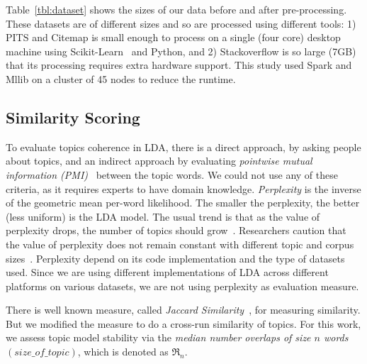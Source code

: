\documentclass[twocolumn,5p,sort&compress]{elsarticle}
\theoremstyle{break}
\begin{document}
  Table~\ref{tbl:dataset} shows the sizes of our data before and after pre-processing.
  These datasets are of different sizes and so are processed using different tools: 1) PITS and Citemap is small enough to process on a single (four core) desktop machine
  using Scikit-Learn~\cite{pedregosa2011scikit} and Python, and 2) Stackoverflow is so large (7GB) that its  processing requires extra hardware support.
 This study used Spark and Mllib on a cluster of 45 nodes to
 reduce the runtime.
  




\subsection{Similarity Scoring}
To evaluate topics coherence in LDA, there is a direct approach, by asking people about topics, and an indirect approach by evaluating \textit{pointwise mutual information (PMI)}~\cite{lau2014machine, o2015analysis} between the topic words. We could not use any of these criteria, as it requires experts to have domain knowledge. \textit{Perplexity} is  the inverse of the geometric mean per-word likelihood. The smaller the perplexity, the better (less uniform) is the LDA model. The usual trend is that as the value of perplexity drops, the number of topics should grow~\cite{koltcov2014latent}. Researchers caution that the value of perplexity does not remain constant with different topic and corpus sizes~\cite{ zhao2015heuristic}. Perplexity depend on its code implementation and the type of datasets used. Since we are using different implementations of LDA across different platforms on various datasets, we are not using perplexity as evaluation measure.

There is well known measure, called \textit{Jaccard Similarity}~\cite{o2015analysis, galvis2013analysis}, for measuring similarity. But we modified the measure to do a cross-run similarity of topics. For this work, we assess topic model stability via the {\em median number overlaps of size $n$ words $\mathit{(size\_of\_topic)}$}, which is denoted as $\Re_n$.
 
\end{document}
